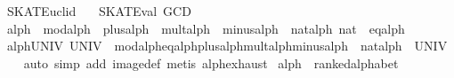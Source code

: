 %
\begin{isabellebody}%
\def\isabellecontext{SKAT{\isaliteral{5F}{\isacharunderscore}}Euclid}%
%
\isadelimtheory
%
\endisadelimtheory
%
\isatagtheory
{}\isamarkupfalse%
\ SKAT{}Euclid\isanewline
\ \ \ SKAT{}Eval\ GCD\isanewline
{}%
\endisatagtheory
{\isafoldtheory}%
%
\isadelimtheory
\isanewline
%
\endisadelimtheory
\isanewline
{}\isamarkupfalse%
\ alph\ {}\ mod{}alph\ {}\ plus{}alph\ {}\ mult{}alph\ {}\ minus{}alph\ {}\ nat{}alph\ nat\ {}\ eq{}alph\isanewline
\isanewline
{}\isamarkupfalse%
\ alph{}UNIV{}\ {}UNIV\ {}\ {}mod{}alph{}eq{}alph{}plus{}alph{}mult{}alph{}minus{}alph{}\ {}\ {}nat{}alph\ {}\ UNIV{}{}\isanewline
%
\isadelimproof
\ \ %
\endisadelimproof
%
\isatagproof
{}\isamarkupfalse%
\ {}auto\ simp\ add{}\ image{}def{}\ metis\ alph{}exhaust{}%
\endisatagproof
{\isafoldproof}%
%
\isadelimproof
\isanewline
%
\endisadelimproof
\isanewline
{}\isamarkupfalse%
\ alph\ {}{}\ ranked{}alphabet\isanewline
{}\isanewline
\isanewline
\ \ \isamarkupfalse%

\end{isabellebody}
